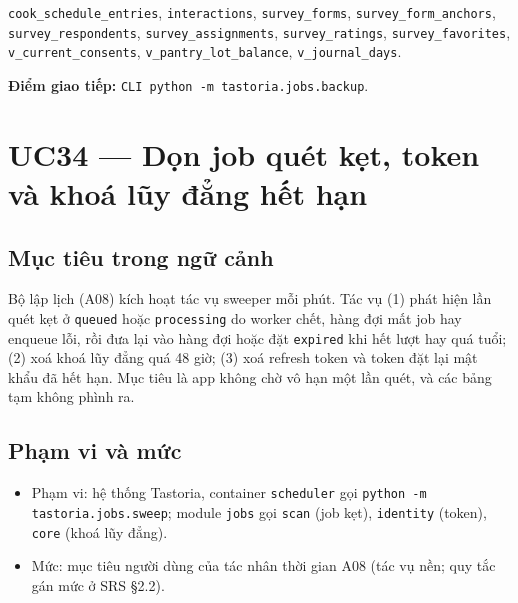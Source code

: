 {\small\texttt{cook\_\allowbreak{}\allowbreak{}schedule\_\allowbreak{}\allowbreak{}entries}}, {\small\texttt{interactions}}, {\small\texttt{survey\_\allowbreak{}\allowbreak{}forms}}, {\small\texttt{survey\_\allowbreak{}\allowbreak{}form\_\allowbreak{}\allowbreak{}anchors}}, {\small\texttt{survey\_\allowbreak{}\allowbreak{}respondents}}, {\small\texttt{survey\_\allowbreak{}\allowbreak{}assignments}}, {\small\texttt{survey\_\allowbreak{}\allowbreak{}ratings}}, {\small\texttt{survey\_\allowbreak{}\allowbreak{}favorites}}, {\small\texttt{v\_\allowbreak{}\allowbreak{}current\_\allowbreak{}\allowbreak{}consents}}, {\small\texttt{v\_\allowbreak{}\allowbreak{}pantry\_\allowbreak{}\allowbreak{}lot\_\allowbreak{}\allowbreak{}balance}}, {\small\texttt{v\_\allowbreak{}\allowbreak{}journal\_\allowbreak{}\allowbreak{}days}}.

\textbf{Điểm giao tiếp:} {\small\texttt{CLI python -\allowbreak{}m tastoria.\allowbreak{}jobs.\allowbreak{}backup}}.

\section{UC34 --- Dọn job quét kẹt, token và khoá lũy đẳng hết hạn}
\subsection{Mục tiêu trong ngữ cảnh}
Bộ lập lịch (A08) kích hoạt tác vụ sweeper mỗi phút. Tác vụ (1) phát hiện lần quét kẹt ở {\small\texttt{queued}} hoặc {\small\texttt{processing}} do worker chết, hàng đợi mất job hay enqueue lỗi, rồi đưa lại vào hàng đợi hoặc đặt {\small\texttt{expired}} khi hết lượt hay quá tuổi; (2) xoá khoá lũy đẳng quá 48 giờ; (3) xoá refresh token và token đặt lại mật khẩu đã hết hạn. Mục tiêu là app không chờ vô hạn một lần quét, và các bảng tạm không phình ra.

\subsection{Phạm vi và mức}
\begin{itemize}
\item Phạm vi: hệ thống Tastoria, container {\small\texttt{scheduler}} gọi {\small\texttt{python -\allowbreak{}m tastoria.\allowbreak{}jobs.\allowbreak{}sweep}}; module {\small\texttt{jobs}} gọi {\small\texttt{scan}} (job kẹt), {\small\texttt{identity}} (token), {\small\texttt{core}} (khoá lũy đẳng).
\item Mức: mục tiêu người dùng của tác nhân thời gian A08 (tác vụ nền; quy tắc gán mức ở SRS \S{}2.2).
\end{itemize}
